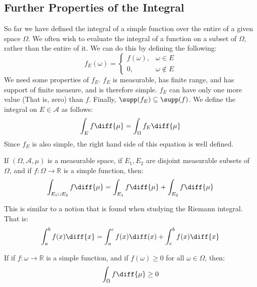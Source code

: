     \subsection{Further Properties of the Integral}
        So far we have defined the integral of a simple
        function over the entire of a given space
        $\Omega$. We often wish to evaluate the integral
        of a function on a subset of $\Omega$, rather
        than the entire of it. We can do this by defining
        the following:
        \begin{equation}
            f_{E}(\omega)=
            \begin{cases}
                f(\omega),&\omega\in{E}\\
                0,&\omega\notin{E}
            \end{cases}
        \end{equation}
        We need some properties of $f_{E}$.
        $f_{E}$ is measurable, has finite range, and
        has support of finite measure, and is therefore
        simple. $f_{E}$ can have only one more value
        (That is, zero) than $f$. Finally,
        $\supp(f_{E})\subseteq{\supp(f)}$. We define
        the integral on $E\in\mathcal{A}$ as follows:
        \begin{equation}
            \int_{E}f\diff{\mu}=
            \int_{\Omega}f_{E}\diff{\mu}
        \end{equation}
        Since $f_{E}$ is also simple, the right hand
        side of this equation is well defined.
        \begin{theorem}
            If $(\Omega,\mathcal{A},\mu)$ is a measurable
            space, if $E_{1},E_{2}$ are disjoint
            measurable subsets of $\Omega$, and if
            $f:\Omega\rightarrow\mathbb{R}$ is a simple
            function, then:
            \begin{equation}
                \int_{E_{1}\cup{E}_{2}}f\diff{\mu}=
                \int_{E_{1}}f\diff{\mu}+
                \int_{E_{2}}f\diff{\mu}
            \end{equation}
        \end{theorem}
        This is similar to a notion that is found when
        studying the Riemann integral. That is:
        \begin{equation}
            \int_{a}^{b}f(x)\diff{x}=
            \int_{a}^{c}f(x)\diff(x)+
            \int_{c}^{b}f(x)\diff{x}
        \end{equation}
        \begin{theorem}
            If if $f:\omega\rightarrow\mathbb{R}$
            is a simple function, and if
            $f(\omega)\geq{0}$ for all $\omega\in\Omega$,
            then:
            \begin{equation}
                \int_{\Omega}f\diff{\mu}\geq{0}
            \end{equation}
        \end{theorem}

